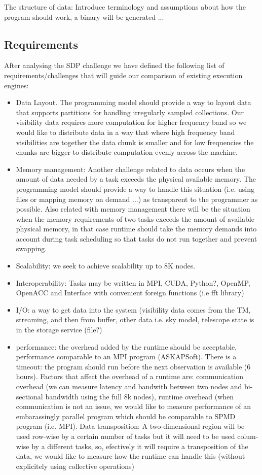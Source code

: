 \documentclass[11pt,a4paper]{article}
\begin{document}
The structure of data: Introduce terminology and assumptions about how the program should work, a binary will be generated ...

\subsection{Requirements}

After analysing the SDP challenge we have defined the following list of requirements/challenges that will guide our comparison of existing execution engines:
\begin{itemize}
\item Data Layout. The programming model should provide a way to layout data that supports partitions for handling irregularly sampled collections.
Our visibility data requires more computation for higher frequency band so we would like to distribute data in a way that where high frequency band
visibilities are together the data chunk is smaller and for low frequencies the chunks are bigger to distribute computation evenly across the machine.
\item Memory management: Another challenge related to data occurs when the amount of data needed by a task exceeds the physical available memory. 
The programming model should provide a way to handle this situation (i.e. using files or mapping memory on demand ...) as transparent to the programmer as possible. Also related with memory management there will be the situation when the memory requirements of two tasks exceeds the amount of available physical memory, in that case runtime should take the memory demands into account during task scheduling so that tasks do not run together and prevent swapping.  
\item Scalability: we seek to achieve scalability up to 8K nodes.
\item Interoperability: Tasks may be written in  MPI, CUDA, Python?, OpenMP, OpenACC and Interface with convenient foreign functions  (i.e fft library)
\item I/O: a way to get data into the system (visibility data comes from the TM, streaming, and then from buffer, other data i.e. sky model, telescope state is in the storage service (file?)
\item performance: the overhead added by the runtime should be acceptable, performance comparable to an MPI program (ASKAPSoft). There is a timeout: the program should run before the next observation is available (6 hours). Factors that affect the overhead of a runtime are: communication overhead (we can measure latency and bandwith between two nodes and bi-sectional bandwidth using the full 8k nodes), runtime overhead (when communication is not an issue, we would like to measure performance of an embarassingly parallel program which should be comparable to SPMD program (i.e. MPI). Data transposition: A two-dimensional region will be used row-wise by a certain number of tasks but it will need to be used colum-wise by a different tasks, so, efectively it will require a transposition of the data, we would like to measure how the runtime can handle this (without explicitely using collective operations) 

\end{itemize}
\end{document}
